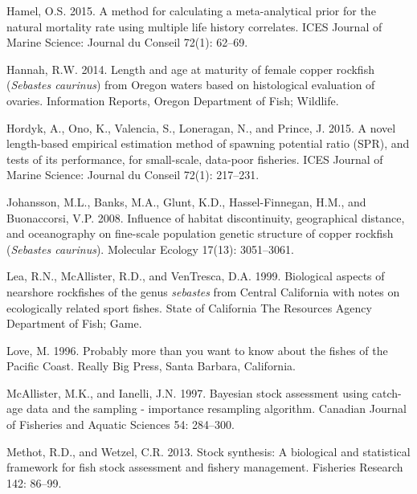 \documentclass[11pt,
  english,
  a4paper,
]{article}
\newlength{\cslhangindent}
\newenvironment{CSLReferences}[2] %
 {%
  \setlength{\parindent}{0pt}
  \ifodd #1 \everypar{\setlength{\hangindent}{\cslhangindent}}\ignorespaces\fi
  \ifnum #2 > 0
  \setlength{\parskip}{#2\baselineskip}
  \fi
 }%
 {}
\begin{document}
\begin{CSLReferences}{1}{0}
\leavevmode{}%
Hamel, O.S. 2015. A method for calculating a meta-analytical prior for the natural mortality rate using multiple life history correlates. ICES Journal of Marine Science: Journal du Conseil 72(1): 62--69.

\leavevmode{}%
Hannah, R.W. 2014. Length and age at maturity of female copper rockfish (\emph{{Sebastes} caurinus}) from {Oregon} waters based on histological evaluation of ovaries. Information Reports, Oregon Department of Fish; Wildlife.

\leavevmode{}%
Hordyk, A., Ono, K., Valencia, S., Loneragan, N., and Prince, J. 2015. A novel length-based empirical estimation method of spawning potential ratio ({SPR}), and tests of its performance, for small-scale, data-poor fisheries. ICES Journal of Marine Science: Journal du Conseil 72(1): 217--231.

\leavevmode{}%
Johansson, M.L., Banks, M.A., Glunt, K.D., Hassel-Finnegan, H.M., and Buonaccorsi, V.P. 2008. Influence of habitat discontinuity, geographical distance, and oceanography on fine-scale population genetic structure of copper rockfish (\emph{{Sebastes} caurinus}). Molecular Ecology 17(13): 3051--3061.

\leavevmode{}%
Lea, R.N., McAllister, R.D., and VenTresca, D.A. 1999. Biological aspects of nearshore rockfishes of the genus \emph{sebastes} from {Central} {California} with notes on ecologically related sport fishes. State of California The Resources Agency Department of Fish; Game.

\leavevmode{}%
Love, M. 1996. Probably more than you want to know about the fishes of the {Pacific} {Coast}. Really Big Press, Santa Barbara, California.

\leavevmode{}%
McAllister, M.K., and Ianelli, J.N. 1997. Bayesian stock assessment using catch-age data and the sampling - importance resampling algorithm. Canadian Journal of Fisheries and Aquatic Sciences 54: 284--300.

\leavevmode{}%
Methot, R.D., and Wetzel, C.R. 2013. Stock synthesis: A biological and statistical framework for fish stock assessment and fishery management. Fisheries Research 142: 86--99.


\end{CSLReferences}
\end{document}
